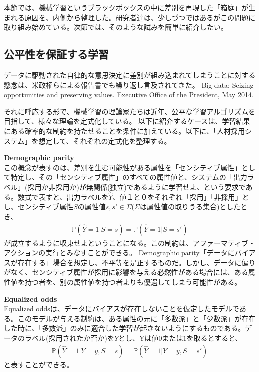 \documentclass[b5j,twoside,twocolumn]{utarticle}
\begin{document}
本節では、機械学習というブラックボックスの中に差別を再現した「箱庭」が生まれる原因を、\.内\.側から整理した。研究者達は、少しづつではあるがこの問題に取り組み始めている。次節では、そのような試みを簡単に紹介したい。


\subsection{公平性を保証する学習}
データに駆動された自律的な意思決定に差別が組み込まれてしまうことに対する懸念は、米政権らによる報告書でも繰り返し言及されてきた。
Big data: Seizing opportunities and preserving values. Executive Office of the
President, May 2014.

それに呼応する形で、機械学習の理論家たちは近年、公平な学習アルゴリズムを目指して、様々な理論を定式化している。
以下に紹介するケースは、学習結果にある確率的な制約を持たせることを条件に加えている。以下に、「人材採用システム」を想定して、それぞれの定式化を整理する。

\textbf{Demographic parity}\\
この概念が表すのは、差別を生む可能性がある属性を「センシティブ属性」として特定し、その「センシティブ属性」のすべての属性値と、システムの「出力ラベル」(採用か非採用か)が無関係(独立)であるように学習せよ、という要求である。数式で表すと、出力ラベルを$\hat{Y}$、値１と０をそれぞれ「採用」「非採用」とし、センシティブ属性$S$の属性値$s, s' \in \Sigma$($\Sigma$は属性値の取りうる集合)としたとき、
\begin{eqnarray}
\mathbb{P}(\hat{Y} = 1|S=s) =  \mathbb{P}(\hat{Y} = 1|S=s')
\end{eqnarray}
が成立するように収束せよということになる。この制約は、アファーマティブ・アクションの実行とみなすことができる。
Demographic parity「データにバイアスが存在する」場合を想定し、不平等を是正するものだ。しかし、データに偏りがなく、センシティブ属性が採用に影響を与える必然性がある場合には、ある属性値を持つ者を、別の属性値を持つ者よりも優遇してしまう可能性がある。

\textbf{Equalized odds}\\
Equalized oddsは、データにバイアスが存在しないことを仮定したモデルである。このモデルが与える制約は、ある属性の元に「多数派」と「少数派」が存在した時に、「多数派」のみに適合した学習が起きないようにするものである。データのラベル(採用されたか否か)を$Y$とし、Yは値$0または1$を取るとすると、
\begin{eqnarray}
\mathbb{P}(\hat{Y} = 1|Y=y, S=s) =  \mathbb{P}(\hat{Y} = 1|Y=y, S=s')
\end{eqnarray}
と表すことができる。
\end{document}
